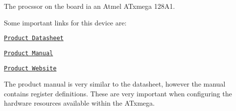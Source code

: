 The procssor on the board ia an Atmel ATxmega 128A1.

Some important links for this device are:


\begin{DoxyItemize}
\item \href{http://www.atmel.com/dyn/resources/prod_documents/doc8067.pdf}{\tt Product Datasheet} 
\item \href{http://www.atmel.com/dyn/resources/prod_documents/doc8077.pdf}{\tt Product Manual} 
\item \href{http://www.atmel.com/dyn/products/product_card.asp?part_id=4298&category_id=163&family_id=607&subfamily_id=1965}{\tt Product Website} 
\end{DoxyItemize}

The product manual is very similar to the datasheet, however the manual contains register definitions. These are very important when configuring the hardware resources available within the ATxmega. 